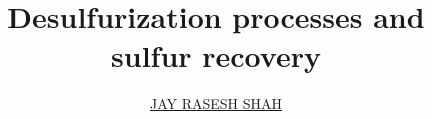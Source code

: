 \documentclass[a4paper,12pt,twoside,openany,Seminar,chapterbib]{ICTv2} %
\title{Desulfurization processes and sulfur recovery}
\author{\href{mailto:jayshah4494@gmail.com}{JAY RASESH SHAH}}
\begin{document}
 


\maketitle

\frontmatter
\tableofcontents

\listoffigures
\begingroup
\let\clearpage\relax
\vspace{3em}
\listoftables
\endgroup

\mainmatter








%
%
\backmatter
\def\nomname{Abbreviations}
\printnomenclature[3cm]
\newpage

\setlength{\bibhang}{7mm}


\end{document}
